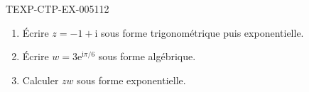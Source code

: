 \begin{exercice}{TEXP-CTP-EX-005}{1}{12}
\begin{enumerate}
  \item Écrire $z=-1+\mathrm{i}$ sous forme trigonométrique puis exponentielle.
  \item Écrire $w=3\mathrm{e}^{\mathrm{i}\pi/6}$ sous forme algébrique.
  \item Calculer $zw$ sous forme exponentielle.
\end{enumerate}
\end{exercice}
